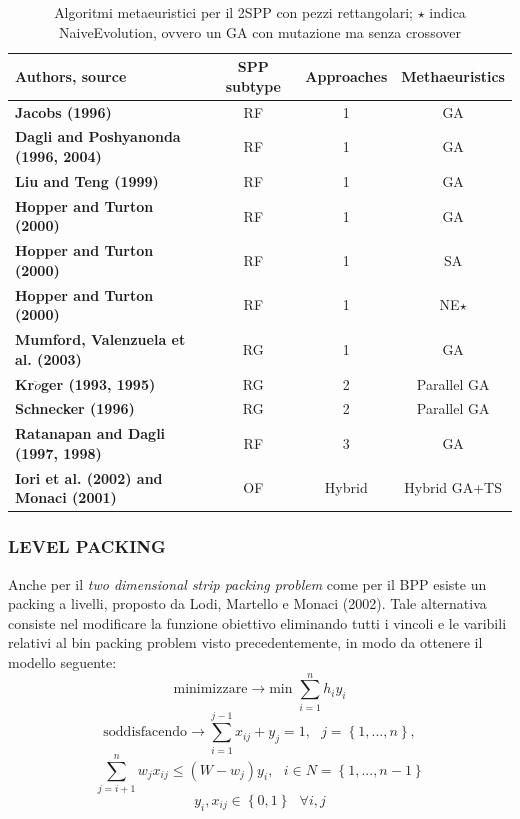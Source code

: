 \documentclass[12pt,a4paper,openright,twoside]{report}
\begin{document}
\begin{table}[t]
\begin{center}
\begin{tabular}{|||p{3.5cm}||*{2}{c|}| c |||}
\hline
\textbf{Authors, source} & \textbf{SPP subtype} & \textbf{Approaches} & \textbf{Methaeuristics} \\
\hline
\hline
\bfseries    Jacobs (1996) & RF &  1 & GA  \\
\hline
\bfseries    Dagli and Poshyanonda (1996, 2004) & RF &  1 & GA  \\
\hline
\bfseries    Liu and Teng (1999) & RF &  1 & GA  \\
\hline
\bfseries    Hopper and Turton (2000) & RF &  1 & GA  \\
\hline
\bfseries    Hopper and Turton (2000) & RF &  1 & SA  \\
\hline
\bfseries    Hopper and Turton (2000) & RF &  1 & NE$\star$  \\
\hline
\bfseries    Mumford, Valenzuela et al. (2003) & RG &  1 & GA  \\
\hline
\bfseries    Kr$\ddot{o}$ger (1993, 1995) & RG &  2 & Parallel GA  \\
\hline
\bfseries    Schnecker (1996) & RG &  2 & Parallel GA  \\
\hline
\bfseries    Ratanapan and Dagli (1997, 1998) & RF &  3 & GA  \\
\hline
\bfseries    Iori et al. (2002) and Monaci (2001) & OF &  Hybrid & Hybrid GA+TS  \\
\hline
\hline
\end{tabular}
\end{center}
\caption{Algoritmi metaeuristici per il 2SPP con pezzi rettangolari; $\star$ indica NaiveEvolution, ovvero un GA con mutazione ma senza crossover}
\label{lab:table}
\end{table}

\subsubsection{LEVEL PACKING}
Anche per il \textit{two dimensional strip packing problem} come per il BPP esiste un packing a livelli, proposto da Lodi, Martello e Monaci (2002). Tale alternativa consiste nel modificare la funzione obiettivo eliminando tutti i vincoli e le varibili relativi al bin packing problem visto 
precedentemente, in modo da ottenere il modello seguente:
$$\mbox{minimizzare} \longrightarrow \mbox{min } \sum^{n}_{i=1}h_{i}y_{i}$$
$$\mbox{soddisfacendo} \longrightarrow \sum^{j-1}_{i=1}x_{ij} + y_{j} = 1, \mbox{ } j = \left\lbrace 1,...,n \right\rbrace ,$$ 
$$\sum_{j=i+1}^{n} w_{j}x_{ij} \leq (W - w_{j})y_{i}, \mbox{ } i \in N = \left\lbrace 1,...,n-1 \right\rbrace$$ 
$$y_{i}, x_{ij} \in  \left\lbrace 0,1 \right\rbrace \mbox{ } \forall i,j$$
\end{document}
